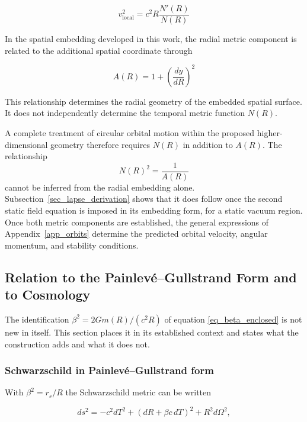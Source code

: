\documentclass[pdflatex,sn-mathphys-num]{sn-jnl}%
\theoremstyle{thmstyleone}%
\theoremstyle{thmstyletwo}%
\theoremstyle{thmstylethree}%
\begin{document}
\begin{equation}
v_{\mathrm{local}}^2
=
c^2R\frac{N'(R)}{N(R)}
\end{equation}

In the spatial embedding developed in this work, the radial metric component is related to the additional spatial coordinate through

\begin{equation}
A(R)
=
1+\left(\frac{dy}{dR}\right)^2
\end{equation}

This relationship determines the radial geometry of the embedded spatial surface. It does not independently determine the temporal metric function $N(R)$.

A complete treatment of circular orbital motion within the proposed higher-dimensional geometry therefore requires $N(R)$ in addition to $A(R)$. The relationship
\begin{equation}
N(R)^2=\frac{1}{A(R)}
\end{equation}
cannot be inferred from the radial embedding alone. Subsection~\ref{sec_lapse_derivation} shows that it does follow once the second static field equation is imposed in its embedding form, for a static vacuum region. Once both metric components are established, the general expressions of Appendix~\ref{app_orbits} determine the predicted orbital velocity, angular momentum, and stability conditions.

\subsection{Relation to the Painlev\'e--Gullstrand Form and to Cosmology}\label{sec_pg_relation}

The identification $\beta^2=2Gm(R)/(c^2R)$ of equation \ref{eq_beta_enclosed} is not new in itself. This section places it in its established context and states what the construction adds and what it does not.

\subsubsection{Schwarzschild in Painlev\'e--Gullstrand form}

With $\beta^2=r_s/R$ the Schwarzschild metric can be written~\cite{Painleve1921,Gullstrand1922,MartelPoisson2001}

\begin{equation}\label{eq_pg_metric}
    ds^2=-c^2dT^2+\left(dR+\beta c\,dT\right)^2+R^2d\Omega^2 ,
\end{equation}
\end{document}
